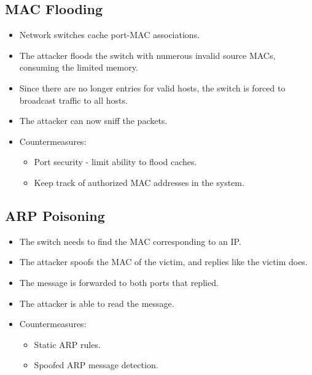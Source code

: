 \documentclass[11pt]{article}
\begin{document}
\subsection{MAC Flooding}
\begin{itemize}
  \item Network switches cache port-MAC associations.
  \item The attacker floods the switch with numerous invalid source MACs, consuming the limited memory.
  \item Since there are no longer entries for valid hosts, the switch is forced to broadcast traffic to all hosts.
  \item The attacker can now sniff the packets.
  \item Countermeasures:
    \begin{itemize}
      \item Port security - limit ability to flood caches.
      \item Keep track of authorized MAC addresses in the system.
    \end{itemize}
\end{itemize}

\subsection{ARP Poisoning}
\begin{itemize}
  \item The switch needs to find the MAC corresponding to an IP.
  \item The attacker spoofs the MAC of the victim, and replies like the victim does.
  \item The message is forwarded to both ports that replied.
  \item The attacker is able to read the message.
  \item Countermeasures:
    \begin{itemize}
      \item Static ARP rules.
      \item Spoofed ARP message detection.
    \end{itemize}
\end{itemize}
\end{document}
